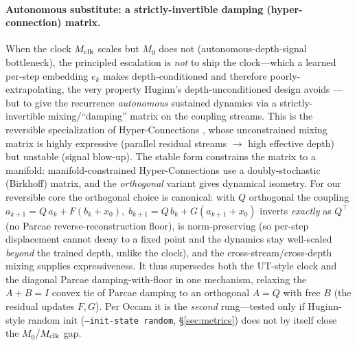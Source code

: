 \documentclass[11pt]{article}
\newcommand{\code}[1]{\texttt{#1}}
\begin{document}
\paragraph{Autonomous substitute: a strictly-invertible damping (hyper-connection) matrix.}
When the clock \(M_{\rm clk}\) scales but \(M_0\) does not (autonomous-depth-signal bottleneck), the
principled escalation is \emph{not} to ship the clock---which a learned per-step embedding
\(e_k\) makes depth-conditioned and therefore poorly-extrapolating, the very property Huginn's
depth-unconditioned design avoids \cite{huginn}---but to give the recurrence \emph{autonomous}
sustained dynamics via a strictly-invertible mixing/``damping'' matrix on the coupling streams.
This is the reversible specialization of Hyper-Connections \cite{hyperconnections}, whose
unconstrained mixing matrix is highly expressive (parallel residual streams \(\to\) high effective
depth) but unstable (signal blow-up).  The stable form constrains the matrix to a manifold:
manifold-constrained Hyper-Connections \cite{mhc} use a doubly-stochastic (Birkhoff) matrix, and
the \emph{orthogonal} variant \cite{jpmhc} gives dynamical isometry.  For our reversible core the
orthogonal choice is canonical: with \(Q\) orthogonal the coupling
\(a_{k+1}=Q\,a_k+F(b_k{+}x_0),\; b_{k+1}=Q\,b_k+G(a_{k+1}{+}x_0)\) inverts \emph{exactly} as
\(Q^{\top}\) (no Parcae reverse-reconstruction floor), is norm-preserving (so per-step displacement
cannot decay to a fixed point and the dynamics stay well-scaled \emph{beyond} the trained depth,
unlike the clock), and the cross-stream/cross-depth mixing supplies expressiveness.  It thus
supersedes both the UT-style clock and the diagonal Parcae damping-with-floor in one mechanism,
relaxing the \(A{+}B{=}I\) convex tie of Parcae damping to an orthogonal \(A=Q\) with free
\(B\) (the residual updates \(F,G\)).
Per Occam it is the \emph{second} rung---tested only if Huginn-style random init
(\code{--init-state random}, \S\ref{sec:metrics}) does not by itself close the \(M_0\)/\(M_{\rm clk}\)
gap.
\end{document}
